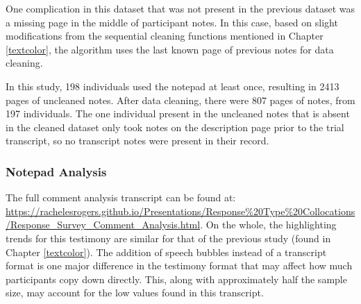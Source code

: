 \documentclass[print]{nuthesis}
\begin{document}
One complication in this dataset that was not present in the previous dataset was a missing page in the middle of participant notes.
In this case, based on slight modifications from the sequential cleaning functions mentioned in Chapter \ref{textcolor}, the algorithm uses the last known page of previous notes for data cleaning.

In this study, 198 individuals used the notepad at least once, resulting in 2413 pages of uncleaned notes.
After data cleaning, there were 807 pages of notes, from 197 individuals.
The one individual present in the uncleaned notes that is absent in the cleaned dataset only took notes on the description page prior to the trial transcript, so no transcript notes were present in their record.

\hypertarget{notepad-analysis-1}{%
\subsubsection{Notepad Analysis}\label{notepad-analysis-1}}

The full comment analysis transcript can be found at: \url{https://rachelesrogers.github.io/Presentations/Response\%20Type\%20Collocations/Response_Survey_Comment_Analysis.html}.
On the whole, the highlighting trends for this testimony are similar for that of the previous study (found in Chapter \ref{textcolor}).
The addition of speech bubbles instead of a transcript format is one major difference in the testimony format that may affect how much participants copy down directly.
This, along with approximately half the sample size, may account for the low values found in this transcript.
\end{document}
